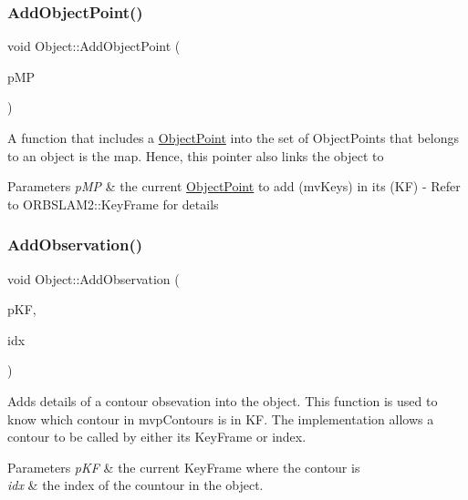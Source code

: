 \subsubsection{\texorpdfstring{Add\+Object\+Point()}{AddObjectPoint()}}
{\footnotesize\ttfamily void Object\+::\+Add\+Object\+Point (\begin{DoxyParamCaption}\item[{\hyperlink{classObjectPoint}{Object\+Point} $\ast$}]{p\+MP }\end{DoxyParamCaption})}

A function that includes a \hyperlink{classObjectPoint}{Object\+Point} into the set of Object\+Points that belongs to an object is the map. Hence, this pointer also links the object to 
\begin{DoxyParams}{Parameters}
{\em p\+MP} & the current \hyperlink{classObjectPoint}{Object\+Point} to add (mv\+Keys) in its (KF) -\/ Refer to O\+R\+B\+S\+L\+A\+M2\+::\+Key\+Frame for details \\
\hline
\end{DoxyParams}
\mbox{\label{classObject_a1e7dbe097a891bee611dd36d64b5de64}} 
\subsubsection{\texorpdfstring{Add\+Observation()}{AddObservation()}}
{\footnotesize\ttfamily void Object\+::\+Add\+Observation (\begin{DoxyParamCaption}\item[{Key\+Frame $\ast$}]{p\+KF,  }\item[{size\+\_\+t}]{idx }\end{DoxyParamCaption})}

Adds details of a contour obsevation into the object. This function is used to know which contour in mvp\+Contours is in KF. The implementation allows a contour to be called by either its Key\+Frame or index. 
\begin{DoxyParams}{Parameters}
{\em p\+KF} & the current Key\+Frame where the contour is \\
\hline
{\em idx} & the index of the countour in the object. \\
\hline
\end{DoxyParams}
\mbox{\label{classObject_a3f843dde478cc5150746d4bc3a8399f8}} 
